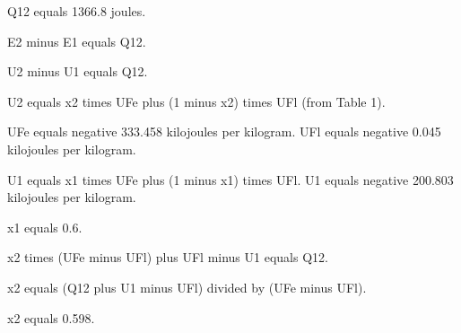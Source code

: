 Q12 equals 1366.8 joules.  

E2 minus E1 equals Q12.  

U2 minus U1 equals Q12.  

U2 equals x2 times UFe plus (1 minus x2) times UFl (from Table 1).  

UFe equals negative 333.458 kilojoules per kilogram.  
UFl equals negative 0.045 kilojoules per kilogram.  

U1 equals x1 times UFe plus (1 minus x1) times UFl.  
U1 equals negative 200.803 kilojoules per kilogram.  

x1 equals 0.6.  

x2 times (UFe minus UFl) plus UFl minus U1 equals Q12.  

x2 equals (Q12 plus U1 minus UFl) divided by (UFe minus UFl).  

x2 equals 0.598.